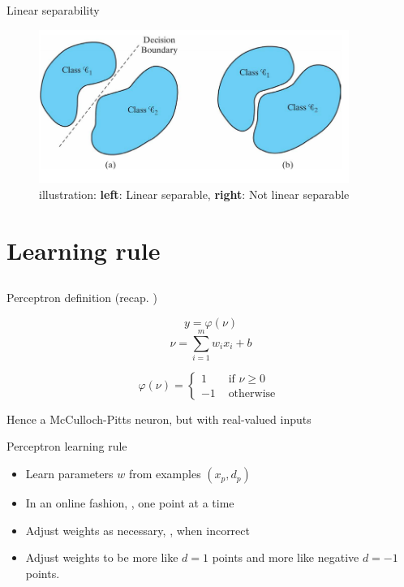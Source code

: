\documentclass[notes]{beamer}
\providecommand{\tightlist}{%
  \setlength{\itemsep}{0pt}\setlength{\parskip}{0pt}}
\begin{document}
\begin{frame}{Linear separability}

\begin{figure}
\centering
\includegraphics[width=0.90000\textwidth]{2018-03-08-22-36-07.png}
\caption{illustration: \textbf{left}: Linear separable, \textbf{right}:
Not linear separable}
\end{figure}

\end{frame}

\section{Learning rule}\label{learning-rule}

\subsection{}\label{section-1}

\begin{frame}{Perceptron definition (recap. )}

\[y=\varphi(\nu)\] \[\nu=\sum_{i=1}^{m} w_i x_i +b \]

\[\varphi (\nu) = \left\{ \begin{array}{cc}
    1  & \text{ if } \nu \ge 0 \\ 
    -1 & \text{ otherwise } 
    \end{array} \right. \]

Hence a McCulloch-Pitts neuron, but with real-valued inputs

\end{frame}

\begin{frame}{Perceptron learning rule}

\begin{itemize}
\tightlist
\item
  Learn parameters \(w\) from examples \((x_p,d_p)\)
\item
  In an online fashion, \ie, one point at a time
\item
  Adjust weights as necessary, \ie, when incorrect
\item
  Adjust weights to be more like \(d=1\) points and more like negative
  \(d=-1\) points.
\end{itemize}

\end{frame}
\end{document}
